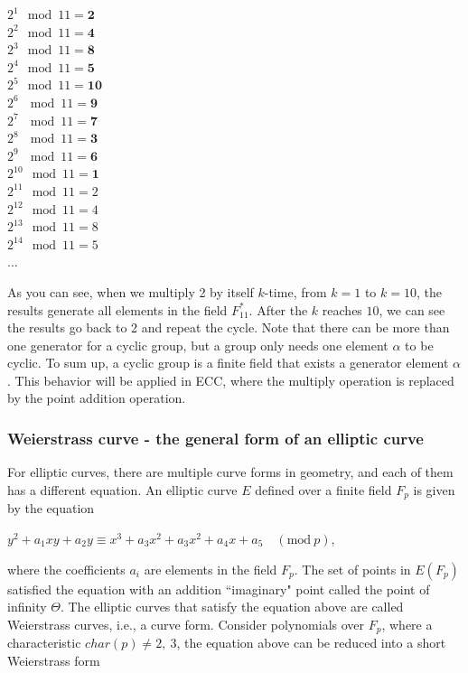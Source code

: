 \setlength{\columnsep}{3cm}
\begin{multicols}{3}
  $2^1 \mod 11 = \mathbf{2}$\\
  $2^2 \mod 11 = \mathbf{4}$\\
  $2^3 \mod 11 = \mathbf{8}$\\
  $2^4 \mod 11 = \mathbf{5}$\\
  $2^5 \mod 11 = \mathbf{10}$\\
  $2^6 \ \mod 11 = \mathbf{9}$\\
  $2^7 \ \mod 11 = \mathbf{7}$\\
  $2^8 \ \mod 11 = \mathbf{3}$\\
  $2^9 \ \mod 11 = \mathbf{6}$\\
  $2^{10} \mod 11 = \mathbf{1}$\\
  $2^{11} \mod 11 = 2$\\
  $2^{12} \mod 11 = 4$\\
  $2^{13} \mod 11 = 8$\\
  $2^{14} \mod 11 = 5$\\
  $\dotso$
\end{multicols}


As you can see, when we multiply 2 by itself $k$-time, from $k = 1$ to $k = 10$, the results generate all elements in the field $F_{11}^*$. After the $k$ reaches $10$, we can see the results go back to 2 and repeat the cycle. Note that there can be more than one generator for a cyclic group, but a group only needs one element $\alpha$ to be cyclic. To sum up, a cyclic group is a finite field that exists a generator element $\alpha$. This behavior will be applied in ECC, where the multiply operation is replaced by the point addition operation.

\subsubsection{Weierstrass curve - the general form of an elliptic curve}
For elliptic curves, there are multiple curve forms in geometry, and each of them has a different equation. An elliptic curve $E$ defined over a finite field $F_p$ is given by the equation


\begin{center}
  $y^2 + a_1xy + a_2y \equiv x^3 + a_3x^2 + a_3x^2 + a_4x + a_5 \quad (\text{mod} \ p)$,\\
\end{center}


where the coefficients $a_i$ are elements in the field $F_p$. The set of points in $E(F_p)$ satisfied the equation with an addition ``imaginary" point called the point of infinity $\Theta$. The elliptic curves that satisfy the equation above are called Weierstrass curves, i.e., a curve form. Consider polynomials over $F_p$, where a characteristic $char(p) \neq 2, \ 3$, the equation above can be reduced into a short Weierstrass form


